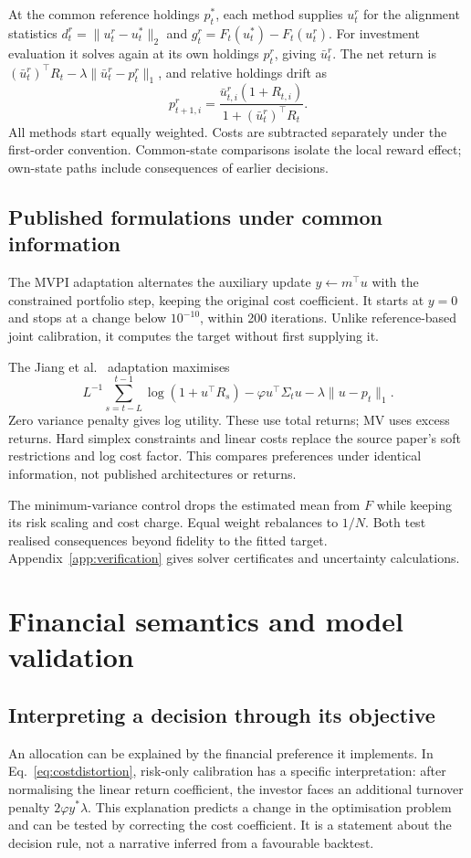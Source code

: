\documentclass[sigconf,anonymous,review]{acmart}
\begin{document}
At the common reference holdings $p_t^*$, each method supplies $u_t^r$ for the alignment statistics $d_t^r=\|u_t^r-u_t^*\|_2$ and $g_t^r=F_t(u_t^*)-F_t(u_t^r)$. For investment evaluation it solves again at its own holdings $p_t^r$, giving $\bar u_t^r$. The net return is $(\bar u_t^r)^\top R_t-\lambda\|\bar u_t^r-p_t^r\|_1$, and relative holdings drift as
\begin{equation}
 p_{t+1,i}^r=\frac{\bar u_{t,i}^r(1+R_{t,i})}{1+(\bar u_t^r)^\top R_t}.
\end{equation}
All methods start equally weighted. Costs are subtracted separately under the first-order convention. Common-state comparisons isolate the local reward effect; own-state paths include consequences of earlier decisions.

\subsection{Published formulations under common information}
The MVPI adaptation alternates the auxiliary update $y\leftarrow m^\top u$ with the constrained portfolio step, keeping the original cost coefficient. It starts at $y=0$ and stops at a change below $10^{-10}$, within 200 iterations. Unlike reference-based joint calibration, it computes the target without first supplying it.

The Jiang et al.~\cite{jiang2025} adaptation maximises
\begin{equation}
 L^{-1}\sum_{s=t-L}^{t-1}\log(1+u^\top R_s)
 -\varphi u^\top\Sigma_tu-\lambda\|u-p_t\|_1.
\end{equation}
Zero variance penalty gives log utility. These use total returns; MV uses excess returns. Hard simplex constraints and linear costs replace the source paper's soft restrictions and log cost factor. This compares preferences under identical information, not published architectures or returns.

The minimum-variance control drops the estimated mean from $F$ while keeping its risk scaling and cost charge. Equal weight rebalances to $1/N$. Both test realised consequences beyond fidelity to the fitted target. Appendix~\ref{app:verification} gives solver certificates and uncertainty calculations.

\section{Financial semantics and model validation}
\subsection{Interpreting a decision through its objective}
An allocation can be explained by the financial preference it implements. In Eq.\ \eqref{eq:costdistortion}, risk-only calibration has a specific interpretation: after normalising the linear return coefficient, the investor faces an additional turnover penalty $2\varphi y^*\lambda$. This explanation predicts a change in the optimisation problem and can be tested by correcting the cost coefficient. It is a statement about the decision rule, not a narrative inferred from a favourable backtest.
\end{document}
